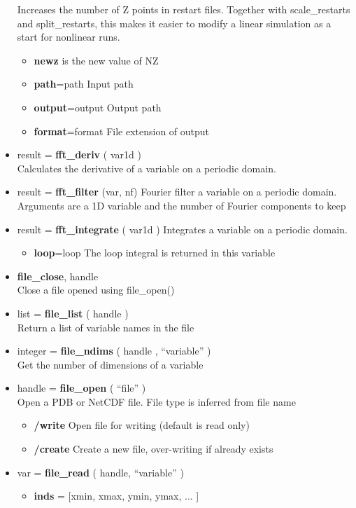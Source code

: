 \documentclass[12pt]{article}
\begin{document}
\begin{itemize}
  Increases the number of Z points in restart files. Together with
  scale\_restarts and split\_restarts, this makes it easier to modify a
  linear simulation as a start for nonlinear runs.
  \begin{itemize}
  \item {\bf newz} is the new value of NZ
  \item {\bf path}=path      Input path
  \item {\bf output}=output  Output path
  \item {\bf format}=format  File extension of output
  \end{itemize}
\item result = {\bf fft\_deriv} ( var1d ) \\
  Calculates the derivative of a variable on a periodic domain.
\item result = {\bf fft\_filter} (var, nf)
  Fourier filter a variable on a periodic domain. Arguments are a
  1D variable and the number of Fourier components to keep
\item result = {\bf fft\_integrate} ( var1d )
  Integrates a variable on a periodic domain.
  \begin{itemize}
  \item {\bf loop}=loop  The loop integral is returned in this variable
  \end{itemize}
\item {\bf file\_close}, handle \\
  Close a file opened using file\_open()
\item list = {\bf file\_list} ( handle ) \\
  Return a list of variable names in the file
\item integer = {\bf file\_ndims} ( handle , ``variable'' ) \\
  Get the number of dimensions of a variable
\item handle = {\bf file\_open} ( ``file'' ) \\
  Open a PDB or NetCDF file. File type is inferred from file name
  \begin{itemize}
    \item {\bf /write}  Open file for writing (default is read only)
    \item {\bf /create} Create a new file, over-writing if already exists
  \end{itemize}
\item var = {\bf file\_read} ( handle, ``variable'' )
  \begin{itemize}
    \item {\bf inds} = [xmin, xmax, ymin, ymax, ... ]

\end{itemize}
\end{itemize}
\end{document}
